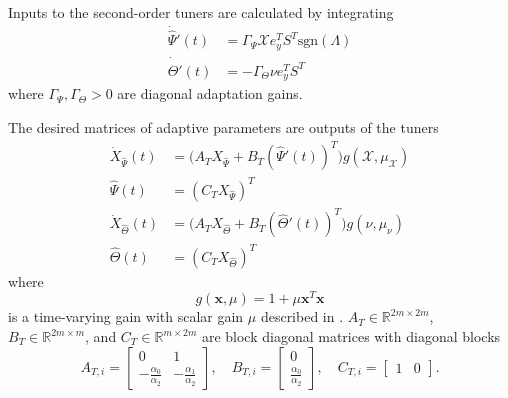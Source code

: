 Inputs to the second-order tuners are calculated by integrating
\begin{equation}
\begin{aligned}
\dot{\hat{\Psi}}'(t) &= \Gamma_{\Psi} \mathcal{X} e_y^T S^T \text{sgn}(\Lambda) \\
\dot{\hat{\Theta}}'(t) &= -\Gamma_{\Theta} \nu e_y^T S^T
\end{aligned} \label{eq:rd3-adaptation-start}
\end{equation}
where $\Gamma_{\Psi}, \Gamma_{\Theta} > 0$ are diagonal adaptation gains. 

The desired matrices of adaptive parameters are outputs of the tuners
\begin{equation}
\begin{aligned}
	\dot{X}_{\hat{\Psi}}(t) &= \big( A_T X_{\hat{\Psi}} + B_T (\hat{\Psi}'(t))^T \big) g(\mathcal{X}, \mu_{\mathcal{X}}) \\
	\hat{\Psi}(t) &= (C_T X_{\hat{\Psi}})^T \\
	\dot{X}_{\hat{\Theta}}(t) &= \big( A_T X_{\hat{\Theta}} + B_T (\hat{\Theta}'(t))^T \big) g(\nu, \mu_{\nu}) \\
	\hat{\Theta}(t) &= (C_T X_{\hat{\Theta}})^T
\end{aligned}	
\end{equation}
where
\begin{equation}
g(\mathbf{x}, \mu) = 1 + \mu \mathbf{x}^T \mathbf{x}	
\end{equation}
is a time-varying gain with scalar gain $\mu$ described in \cite{qu2016phd}. $A_T \in \mathbb{R}^{2m \times 2m}$, $B_T \in \mathbb{R}^{2m \times m}$, and $C_T \in \mathbb{R}^{m \times 2m}$ are block diagonal matrices with diagonal blocks
\begin{equation}
A_{T,i} = \begin{bmatrix}
	0 & 1\\ -\frac{\alpha_0}{\alpha_2} & -\frac{\alpha_1}{\alpha_2}
\end{bmatrix}, \quad B_{T,i} = \begin{bmatrix}
	0 \\ \frac{\alpha_0}{\alpha_2}
\end{bmatrix}, \quad C_{T,i} = \begin{bmatrix}
	1 & 0
\end{bmatrix}.
\end{equation}

